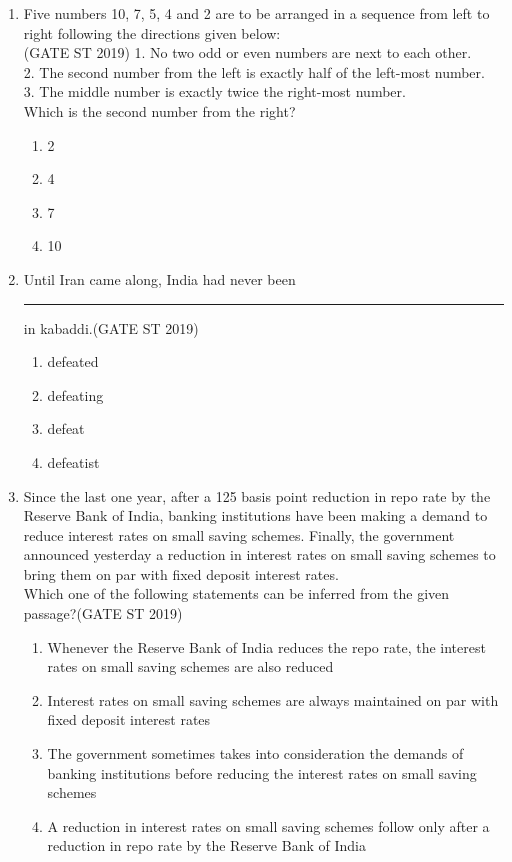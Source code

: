 \documentclass[journal]{IEEEtran}
\begin{document}
\begin{enumerate}
\item Five numbers 10, 7, 5, 4 and 2 are to be arranged in a sequence from left to right following the directions given below:\\
\hspace*{15.7cm}(GATE ST 2019)
1. No two odd or even numbers are next to each other.\\
2. The second number from the left is exactly half of the left-most number.\\
3. The middle number is exactly twice the right-most number.\\
Which is the second number from the right?
\begin{multicols}{4}
\begin{enumerate}
    \item 2 
    \item 4 
    \item 7 
    \item 10 
\end{enumerate}
\end{multicols}

\item Until Iran came along, India had never been \rule{2cm}{0.1pt} in kabaddi.\hfill(GATE ST 2019)
\begin{multicols}{4}
\begin{enumerate}
    \item defeated
    \item defeating
    \item defeat
    \item defeatist
\end{enumerate}
\end{multicols}

\item Since the last one year, after a 125 basis point reduction in repo rate by the Reserve Bank of India, banking institutions have been making a demand to reduce interest rates on small saving schemes. Finally, the government announced yesterday a reduction in interest rates on small saving schemes to bring them on par with fixed deposit interest rates.\\
Which one of the following statements can be inferred from the given passage?\hfill(GATE ST 2019)
\begin{enumerate}
    \item Whenever the Reserve Bank of India reduces the repo rate, the interest rates on small saving schemes are also reduced 
    \item Interest rates on small saving schemes are always maintained on par with fixed deposit interest rates 
    \item The government sometimes takes into consideration the demands of banking institutions before reducing the interest rates on small saving schemes 
    \item A reduction in interest rates on small saving schemes follow only after a reduction in repo rate by the Reserve Bank of India 
\end{enumerate}


\end{enumerate}
\end{document}
